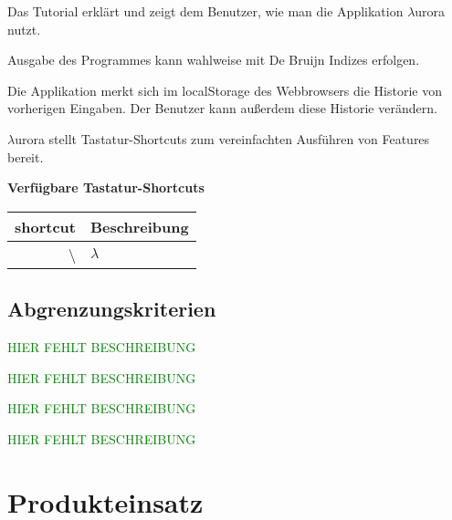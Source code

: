 \documentclass[parskip=full,11pt,twoside]{scrartcl}
\begin{document}
Das Tutorial erklärt und zeigt dem Benutzer, wie man die Applikation $\lambda$urora nutzt.

Ausgabe des Programmes kann wahlweise mit De Bruijn Indizes erfolgen.

Die Applikation merkt sich im localStorage des Webbrowsers die Historie von vorherigen Eingaben. Der Benutzer kann außerdem diese Historie verändern.

$\lambda$urora stellt Tastatur-Shortcuts zum vereinfachten Ausführen von Features bereit.

\textbf{Verfügbare Tastatur-Shortcuts}

\begin{tabular}{|r|l|}
    
    \hline 
    shortcut & Beschreibung \\ \hline
    \textbackslash & $\lambda$ \\ \hline
    
\end{tabular}















\subsection{Abgrenzungskriterien}

\textcolor{green}{HIER FEHLT BESCHREIBUNG}

\textcolor{green}{HIER FEHLT BESCHREIBUNG}

\textcolor{green}{HIER FEHLT BESCHREIBUNG}

\textcolor{green}{HIER FEHLT BESCHREIBUNG}


\pagebreak
\section{Produkteinsatz}
\end{document}
